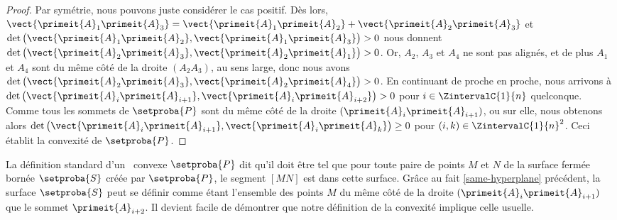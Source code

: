 \begin{proof}
    Par symétrie, nous pouvons juste considérer le cas positif.
	Dès lors,
	$\vect{\primeit{A}_1 \primeit{A}_3} = \vect{\primeit{A}_1 \primeit{A}_2} + \vect{\primeit{A}_2 \primeit{A}_3}$
	et
	$\det \big( \vect{\primeit{A}_1 \primeit{A}_2}, \vect{\primeit{A}_1 \primeit{A}_3} \big) > 0$
    nous donnent
	$\det \big( \vect{\primeit{A}_2 \primeit{A}_3}, \vect{\primeit{A}_2 \primeit{A}_1} \big) > 0$.
	Or, $A_2$, $A_3$ et $A_4$ ne sont pas alignés, et de plus $A_1$ et $A_4$ sont du même côté de la droite $(A_2 A_3)$, au sens large,
	donc nous avons
	$\det \big( \vect{\primeit{A}_2 \primeit{A}_3}, \vect{\primeit{A}_2 \primeit{A}_4} \big) > 0$.
	En continuant de proche en proche, nous arrivons à
	$\det \big( \vect{\primeit{A}_i \primeit{A}_{i+1}}, \vect{\primeit{A}_i \primeit{A}_{i+2}} \big) > 0$
	pour $i \in \ZintervalC{1}{n}$ quelconque.
	Comme tous les sommets de $\setproba{P}$ sont du même côté de la droite $( \primeit{A}_i \primeit{A}_{i+1} )$, ou sur elle,
	nous obtenons alors
	$\det \big( \vect{\primeit{A}_i \primeit{A}_{i+1}}, \vect{\primeit{A}_i \primeit{A}_k} \big) \geq 0$
	pour $(i, k) \in \ZintervalC{1}{n}^2$.
	Ceci établit la convexité de $\setproba{P}$.
\end{proof}




\begin{remark}
    La définition standard d'un \ngone\ convexe $\setproba{P}$ dit qu'il doit être tel que pour toute paire de points $M$ et $N$ de la surface fermée bornée $\setproba{S}$ créée par $\setproba{P}$, le segment $[MN]$ est dans cette surface.
    Grâce au fait \ref{same-hyperplane} précédent, la surface $\setproba{S}$ peut se définir comme étant l'ensemble des points $M$ du même côté de la droite $( \primeit{A}_i \primeit{A}_{i+1} )$ que le sommet $\primeit{A}_{i+2}$.
    Il devient facile de démontrer que notre définition de la convexité implique celle usuelle. 
\end{remark}
